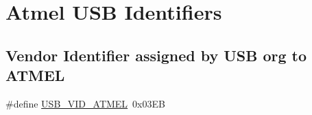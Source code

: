\hypertarget{group__usb__atmel__ids__group}{
\section{\-Atmel \-U\-S\-B \-Identifiers}
\label{group__usb__atmel__ids__group}
}
\subsection*{\-Vendor \-Identifier assigned by \-U\-S\-B org to \-A\-T\-M\-E\-L}
\begin{DoxyCompactItemize}
\item 
\#define \hyperlink{group__usb__atmel__ids__group_ga743cf21f96dd33b647482be549c304f7}{\-U\-S\-B\-\_\-\-V\-I\-D\-\_\-\-A\-T\-M\-E\-L}~0x03\-E\-B
\end{DoxyCompactItemize}
